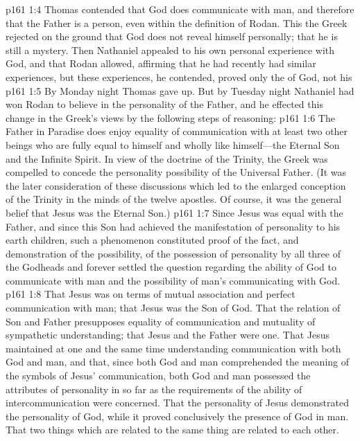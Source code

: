\vs p161 1:4 Thomas contended that God does communicate with man, and therefore that the Father is a person, even within the definition of Rodan. This the Greek rejected on the ground that God does not reveal himself personally; that he is still a mystery. Then Nathaniel appealed to his own personal experience with God, and that Rodan allowed, affirming that he had recently had similar experiences, but these experiences, he contended, proved only the  of God, not his \plusone
\vs p161 1:5 By Monday night Thomas gave up. But by Tuesday night Nathaniel had won Rodan to believe in the personality of the Father, and he effected this change in the Greek’s views by the following steps of reasoning:
\pc \vs p161 1:6 \bibnobreakspace The Father in Paradise does enjoy equality of communication with at least two other beings who are fully equal to himself and wholly like himself---the Eternal Son and the Infinite Spirit. In view of the doctrine of the Trinity, the Greek was compelled to concede the personality possibility of the Universal Father. (It was the later consideration of these discussions which led to the enlarged conception of the Trinity in the minds of the twelve apostles. Of course, it was the general belief that Jesus was the Eternal Son.)
\pc \vs p161 1:7 \bibnobreakspace Since Jesus was equal with the Father, and since this Son had achieved the manifestation of personality to his earth children, such a phenomenon constituted proof of the fact, and demonstration of the possibility, of the possession of personality by all three of the Godheads and forever settled the question regarding the ability of God to communicate with man and the possibility of man’s communicating with God.
\pc \vs p161 1:8 \bibnobreakspace That Jesus was on terms of mutual association and perfect communication with man; that Jesus was the Son of God. That the relation of Son and Father presupposes equality of communication and mutuality of sympathetic understanding; that Jesus and the Father were one. That Jesus maintained at one and the same time understanding communication with both God and man, and that, since both God and man comprehended the meaning of the symbols of Jesus’ communication, both God and man possessed the attributes of personality in so far as the requirements of the ability of intercommunication were concerned. That the personality of Jesus demonstrated the personality of God, while it proved conclusively the presence of God in man. That two things which are related to the same thing are related to each other.

